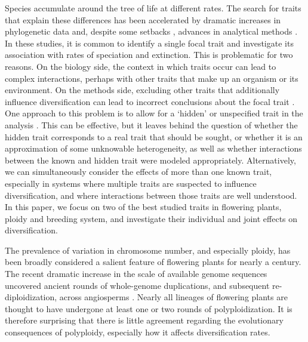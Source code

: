 Species accumulate around the tree of life at different rates.
The search for traits that explain these differences has been accelerated by dramatic increases in phylogenetic data and, despite some setbacks \citep{maddison_2015, rabosky_2015}, advances in analytical methods \citep{maddison_2007, fitzjohn_2009, goldberg_2012, beaulieu_2016}. %
In these studies, it is common to identify a single focal trait and investigate its association with rates of speciation and extinction. %
This is problematic for two reasons.
On the biology side, the context in which traits occur can lead to complex interactions, perhaps with other traits that make up an organism or its environment.
On the methods side, excluding other traits that additionally influence diversification can lead to incorrect conclusions about the focal trait \citep{rabosky_2015, beaulieu_2016}.
One approach to this problem is to allow for a `hidden' or unspecified trait in the analysis \citep{beaulieu_2016}. %
This can be effective, but it leaves behind the question of whether the hidden trait corresponds to a real trait that should be sought, or whether it is an approximation of some unknowable heterogeneity, as well as whether interactions between the known and hidden trait were modeled appropriately.
Alternatively, we can simultaneously consider the effects of more than one known trait, especially in systems where multiple traits are suspected to influence diversification, and where interactions between those traits are well understood.
In this paper, we focus on two of the best studied traits in flowering plants, ploidy and breeding system, and investigate their individual and joint effects on diversification.

The prevalence of variation in chromosome number, and especially ploidy, has been broadly considered a salient feature of flowering plants for nearly a century. %
The recent dramatic increase in the scale of available genome sequences uncovered ancient rounds of whole-genome duplications, and subsequent re-diploidization, across angiosperms \citep{lynch2000,vision2000}. 
Nearly all lineages of flowering plants are thought to have undergone at least one or two rounds of polyploidization. %
It is therefore surprising that there is little agreement regarding the evolutionary consequences of polyploidy, especially how it affects diversification rates. %

